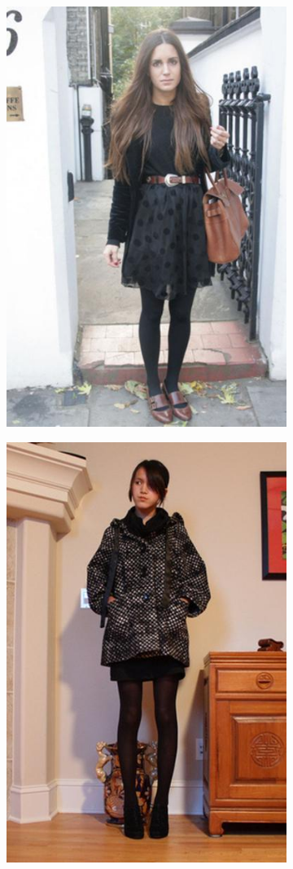 \documentclass[12pt]{report}
\begin{document}
\begin{figure}
\centering
  \begin{subfigure}[b]{0.2\textwidth}
  \centering
    \includegraphics[scale=0.2]{images/paper1.jpg}
    \caption{}
    \label{fig:1}
  \end{subfigure}
  \begin{subfigure}[b]{0.2\textwidth}
  \centering
    \includegraphics[scale=0.2]{images/paper2.jpg}

\end{subfigure}
\end{figure}
\end{document}
